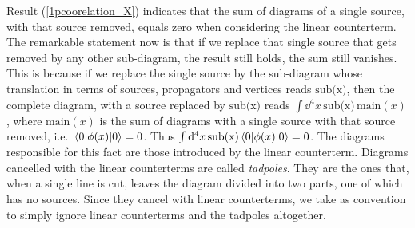 Result (\ref{1pcoorelation_X}) indicates that the sum of diagrams of a single source, with that source removed, equals zero when considering the linear counterterm. The remarkable statement now is that if we replace that single source that gets removed by any other sub-diagram, the result still holds, the sum still vanishes. This is because if we replace the single source by the sub-diagram whose translation in terms of sources, propagators and vertices reads $\text{sub(x)}$, then the complete diagram, with a source replaced by $\text{sub(x)}$ reads $\int \dd^4x\,\text{sub(x)}\,\text{main}(x)$, where $\text{main}(x)$ is the sum of diagrams with a single source with that source removed, i.e. $\vev{\phi(x)}=0$. Thus $\int\dd^4x\,\text{sub(x)}\vev{\phi(x)}=0$. The diagrams responsible for this fact are those introduced by the linear counterterm. Diagrams cancelled with the linear counterterms are called \textit{tadpoles}. They are the ones that, when a single line is cut, leaves the diagram divided into two parts, one of which has no sources. Since they cancel with linear counterterms, we take as convention to simply ignore linear counterterms and the tadpoles altogether. \\
